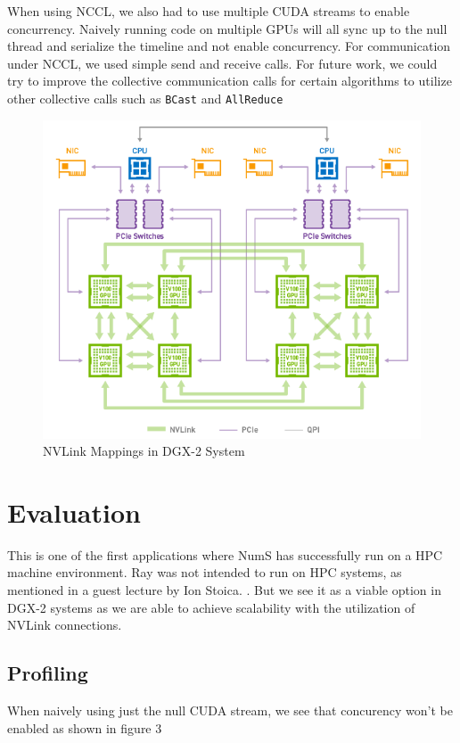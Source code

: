 \documentclass{article}
\begin{document}
When using NCCL, we also had to use multiple CUDA streams to enable concurrency. Naively running code on multiple GPUs will all sync up to the null thread and serialize the timeline and not enable concurrency. For communication under NCCL, we used simple send and receive calls. For future work, we could try to improve the collective communication calls for certain algorithms to utilize other collective calls such as \verb|BCast| and \verb|AllReduce|

\begin{figure}
  \centerline{\includegraphics[width=6in]{figures/nvlink.png}}
  \caption{NVLink Mappings in DGX-2 System}
\end{figure}

\section{Evaluation}
This is one of the first applications where NumS has successfully run on a HPC machine environment. Ray was not intended to run on HPC systems, as mentioned in a guest lecture by Ion Stoica. \cite{ray-lecture}. But we see it as a viable option in DGX-2 systems as we are able to achieve scalability with the utilization of NVLink connections. 

\subsection{Profiling}
When naively using just the null CUDA stream, we see that concurency won't be enabled as shown in figure 3
\end{document}
